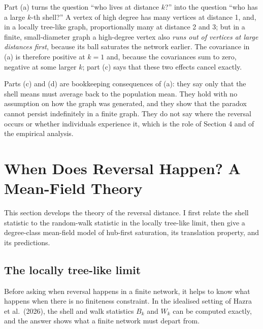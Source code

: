 \documentclass{nws}
\begin{document}
Part (a) turns the question ``who lives at distance $k$?'' into the question
``who has a large $k$-th shell?'' A vertex of high degree has many vertices at
distance 1, and, in a locally tree-like graph, proportionally many at
distance 2 and 3; but in a finite, small-diameter graph a high-degree vertex
also \emph{runs out of vertices at large distances first}, because its ball
saturates the network earlier. The covariance in (a) is therefore positive at
$k=1$ and, because the covariances sum to zero, negative at some larger $k$;
part (c) says that these two effects cancel exactly.

Parts (c) and (d) are bookkeeping consequences of (a): they say only that the
shell means must average back to the population mean. They hold with no
assumption on how the graph was generated, and they show that the paradox cannot persist
indefinitely in a finite graph. They do not say where the reversal occurs or whether individuals
experience it, which is the role of Section 4 and of the empirical analysis.

\section{When Does Reversal Happen? A Mean-Field Theory}

This section develops the theory of the reversal distance. I first relate the shell statistic to the random-walk statistic in the locally tree-like limit, then give a degree-class mean-field model of hub-first saturation, its translation property, and its predictions.

\subsection{The locally tree-like limit}

Before asking when reversal happens in a finite network, it helps to know what happens when there is no finiteness constraint. In the idealised setting of Hazra et al.\ (2026), the shell and walk statistics $B_k$ and $W_k$ can be computed exactly, and the answer shows what a finite network must depart from.
\end{document}
